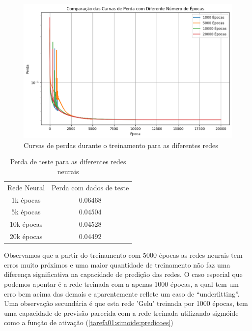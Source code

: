 \begin{figure}
	\centering
	\caption{Curvas de perdas durante o treinamento para as diferentes 
	redes}\label{tarefa02:figura:curvas}
	\includegraphics[width=0.7\linewidth]{./0803_imgs/png-241110-160937603-16503693892993531452.png}
\end{figure}

\begin{table}[htb]
	\caption{Perda de teste para as diferentes redes neurais}
	\centering
	\label{tarefa02:tabela:perdas}
\begin{tabular}{c | c}
	Rede Neural & Perda com dados de teste \\
	1k épocas  &  0.06468 \\
	5k épocas  &  0.04504 \\
	10k épocas &  0.04528 \\
	20k épocas &  0.04492
\end{tabular}
\end{table}

Observamos que a partir do treinamento com 5000 épocas as redes neurais tem 
erros muito próximos e uma maior quantidade de treinamento não faz uma 
diferença significativa na capacidade de predição das redes. O caso especial 
que podemos apontar é a rede treinada com a apenas 1000 épocas, a qual tem um 
erro bem acima das demais e aparentemente reflete um caso de ``underfitting''. 
Uma observação secundária é que esta rede 'Gelu' treinada por 1000 épocas, tem 
uma capacidade de previsão parecida com a rede treinada utilizando sigmóide 
como a função de ativação (\cref{tarefa01:simoide:predicoes})
